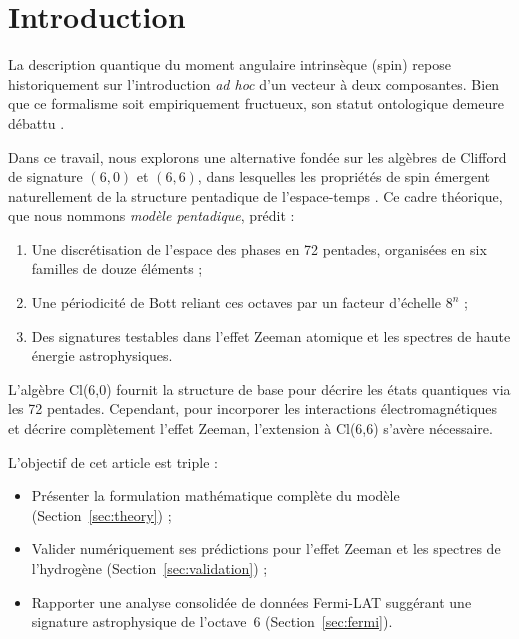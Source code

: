 \documentclass[11pt,a4paper]{article}
\theoremstyle{plain}
\theoremstyle{definition}
\theoremstyle{remark}
\begin{document}
\newpage
\tableofcontents
\newpage

\section{Introduction}

La description quantique du moment angulaire intrinsèque (spin) repose historiquement sur l'introduction \textit{ad hoc} d'un vecteur à deux composantes. Bien que ce formalisme soit empiriquement fructueux, son statut ontologique demeure débattu \cite{rowlands2015foundations}.

Dans ce travail, nous explorons une alternative fondée sur les algèbres de Clifford de signature $(6,0)$ et $(6,6)$, dans lesquelles les propriétés de spin émergent naturellement de la structure pentadique de l'espace-temps \cite{nebe2010even}. Ce cadre théorique, que nous nommons \textit{modèle pentadique}, prédit :

\begin{enumerate}
  \item Une discrétisation de l'espace des phases en 72 pentades, organisées en six familles de douze éléments ;
  \item Une périodicité de Bott \cite{bott1959stable} reliant ces octaves par un facteur d'échelle $8^n$ ;
  \item Des signatures testables dans l'effet Zeeman atomique et les spectres de haute énergie astrophysiques.
\end{enumerate}

L'algèbre Cl(6,0) fournit la structure de base pour décrire les états quantiques via les 72 pentades. Cependant, pour incorporer les interactions électromagnétiques et décrire complètement l'effet Zeeman, l'extension à Cl(6,6) s'avère nécessaire.

L'objectif de cet article est triple :
\begin{itemize}
  \item Présenter la formulation mathématique complète du modèle (Section~\ref{sec:theory}) ;
  \item Valider numériquement ses prédictions pour l'effet Zeeman et les spectres de l'hydrogène (Section~\ref{sec:validation}) ;
  \item Rapporter une analyse consolidée de données Fermi-LAT suggérant une signature astrophysique de l'octave~6 (Section~\ref{sec:fermi}).
\end{itemize}
\end{document}
